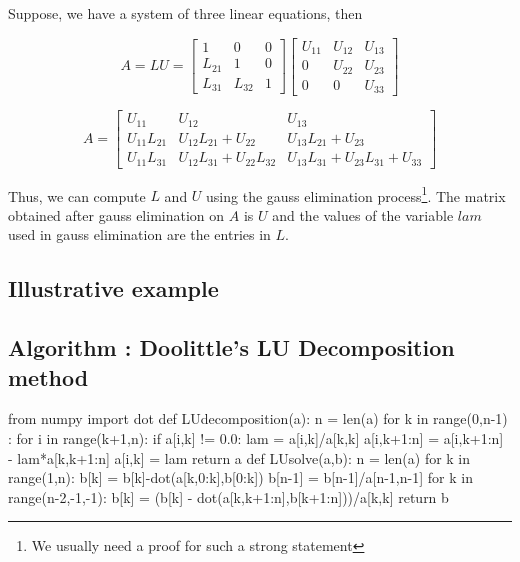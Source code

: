 Suppose, we have a system of three linear equations, then

\[ A = LU = \begin{bmatrix} 1 & 0 & 0 \\ L_{21} & 1 & 0 \\ L_{31} & L_{32} & 1 \end{bmatrix} \begin{bmatrix} U_{11} & U_{12} & U_{13} \\ 0 & U_{22} & U_{23} \\ 0 & 0 & U_{33} \end{bmatrix} \]

\[ A= \begin{bmatrix} U_{11} & U_{12} & U_{13} \\ U_{11}L_{21} & U_{12}L_{21} + U_{22} & U_{13}L_{21}+U_{23} \\ U_{11}L_{31} & U_{12}L_{31}+U_{22}L_{32} & U_{13}L_{31} + U_{23}L_{31} + U_{33} \end{bmatrix} \]

	Thus, we can compute $L$ and $U$ using the gauss elimination process\footnote{We usually need a proof for such a strong statement}. The matrix obtained after gauss elimination on $A$ is $U$ and the values of the variable $lam$ used in gauss elimination are the entries in $L$.

\subsection{Illustrative example}

\subsection{Algorithm : Doolittle's LU Decomposition method}
\begin{program}
	\begin{python}
		from numpy import dot
		def LUdecomposition(a):
			n = len(a)
			for k in range(0,n-1) : 
				for i in range(k+1,n):
					if a[i,k] != 0.0:
						lam = a[i,k]/a[k,k]
						a[i,k+1:n] = a[i,k+1:n] - lam*a[k,k+1:n]
						a[i,k] = lam
			return a
		def LUsolve(a,b):
			n = len(a)
			for k in range(1,n):
				b[k] = b[k]-dot(a[k,0:k],b[0:k])
			b[n-1] = b[n-1]/a[n-1,n-1]
			for k in range(n-2,-1,-1):
				b[k] = (b[k] - dot(a[k,k+1:n],b[k+1:n]))/a[k,k]
			return b
	\end{python}
\end{program}

